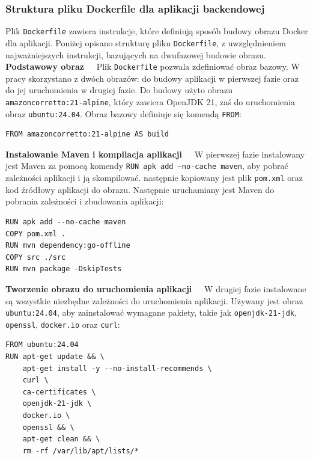 \subsubsection{Struktura pliku Dockerfile dla aplikacji backendowej}

Plik \texttt{Dockerfile} zawiera instrukcje, które definiują sposób budowy obrazu Docker dla aplikacji. Poniżej opisano strukturę pliku \texttt{Dockerfile}, z uwzględnieniem najważniejszych instrukcji, bazujących na dwufazowej budowie obrazu.\\[-10pt]

\noindent \textbf{Podstawowy obraz~~}
Plik \texttt{Dockerfile} pozwala zdefiniować obraz bazowy. W pracy skorzystano z dwóch obrazów: do budowy aplikacji w pierwszej fazie oraz do jej uruchomienia w drugiej fazie. Do budowy użyto obrazu \texttt{amazoncorretto:21-alpine}, który zawiera OpenJDK 21, zaś do uruchomienia obraz \texttt{ubuntu:24.04}. Obraz bazowy definiuje się komendą \texttt{FROM}:
\begin{lstlisting}[basicstyle=\footnotesize\ttfamily]
FROM amazoncorretto:21-alpine AS build
\end{lstlisting}

\noindent \textbf{Instalowanie Maven i kompilacja aplikacji~~}
W pierwszej fazie instalowany jest Maven za pomocą komendy \texttt{RUN apk add --no-cache maven}, aby pobrać zależności aplikacji i ją skompilować. następnie kopiowany jest plik \texttt{pom.xml} oraz kod źródłowy aplikacji do obrazu. Następnie uruchamiany jest Maven do pobrania zależności i zbudowania aplikacji:
\begin{lstlisting}[basicstyle=\footnotesize\ttfamily]
RUN apk add --no-cache maven
COPY pom.xml .
RUN mvn dependency:go-offline
COPY src ./src
RUN mvn package -DskipTests
\end{lstlisting}

\noindent \textbf{Tworzenie obrazu do uruchomienia aplikacji~~}
W drugiej fazie instalowane są wszystkie niezbędne zależności do uruchomienia aplikacji. Używany jest obraz \texttt{ubuntu:24.04}, aby zainstalować wymagane pakiety, takie jak \texttt{openjdk-21-jdk}, \texttt{openssl}, \texttt{docker.io} oraz \texttt{curl}:
\begin{lstlisting}[basicstyle=\footnotesize\ttfamily]
FROM ubuntu:24.04
RUN apt-get update && \
    apt-get install -y --no-install-recommends \
    curl \
    ca-certificates \
    openjdk-21-jdk \
    docker.io \
    openssl && \
    apt-get clean && \
    rm -rf /var/lib/apt/lists/*
\end{lstlisting}

